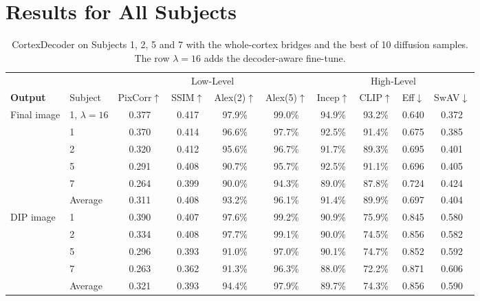 \documentclass[conference]{IEEEtran}
\begin{document}
\clearpage
\begin{table}[p]
\section{Results for All Subjects}
\label{app:subjects}
\vspace{1em}
\centering
\small
\setlength{\tabcolsep}{3pt}
\captionsetup{width=\textwidth}
\begin{tabular*}{\textwidth}{@{\extracolsep{\fill}}p{2.7cm}p{1.4cm}cccccccc@{}}
\toprule
& & \multicolumn{4}{c}{Low-Level} & \multicolumn{4}{c}{High-Level} \\
\cmidrule(lr){3-6}\cmidrule(lr){7-10}
\textbf{Output} & Subject
& PixCorr$\uparrow$ & SSIM$\uparrow$ & Alex(2)$\uparrow$ & Alex(5)$\uparrow$
& Incep$\uparrow$ & CLIP$\uparrow$ & Eff$\downarrow$ & SwAV$\downarrow$ \\
\midrule
\multirow{6}{*}{Final image} & 1, $\lambda = 16$ & 0.377 & 0.417 & 97.9\% & 99.0\% & 94.9\% & 93.2\% & 0.640 & 0.372 \\
\cmidrule(l){2-10}
& 1 & 0.370 & 0.414 & 96.6\% & 97.7\% & 92.5\% & 91.4\% & 0.675 & 0.385 \\
& 2 & 0.320 & 0.412 & 95.6\% & 96.7\% & 91.7\% & 89.3\% & 0.695 & 0.401 \\
& 5 & 0.291 & 0.408 & 90.7\% & 95.7\% & 92.5\% & 91.1\% & 0.696 & 0.405 \\
& 7 & 0.264 & 0.399 & 90.0\% & 94.3\% & 89.0\% & 87.8\% & 0.724 & 0.424 \\
\cmidrule(l){2-10}
& Average & 0.311 & 0.408 & 93.2\% & 96.1\% & 91.4\% & 89.9\% & 0.697 & 0.404 \\
\midrule
\multirow{5}{*}{DIP image} & 1 & 0.390 & 0.407 & 97.6\% & 99.2\% & 90.9\% & 75.9\% & 0.845 & 0.580 \\
& 2 & 0.334 & 0.408 & 97.7\% & 99.1\% & 90.0\% & 74.5\% & 0.856 & 0.582 \\
& 5 & 0.296 & 0.393 & 91.0\% & 97.0\% & 90.1\% & 74.7\% & 0.852 & 0.592 \\
& 7 & 0.263 & 0.362 & 91.3\% & 96.3\% & 88.0\% & 72.2\% & 0.871 & 0.606 \\
\cmidrule(l){2-10}
& Average & 0.321 & 0.393 & 94.4\% & 97.9\% & 89.7\% & 74.3\% & 0.856 & 0.590 \\
\bottomrule
\end{tabular*}
\caption{CortexDecoder on Subjects 1, 2, 5 and 7 with the whole-cortex bridges and the best of 10 diffusion samples. The row $\lambda = 16$ adds the decoder-aware fine-tune.}
\label{tab:reconstruction_subjects_final}


\end{table}
\end{document}
